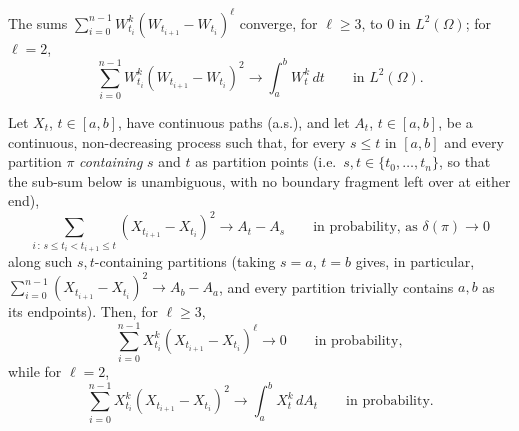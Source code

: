 \documentclass[10pt,a4paper]{amsart}
\begin{document}
\begin{lemma}\label{lem:l1}
The sums $\sum_{i=0}^{n-1}W_{t_i}^k(W_{t_{i+1}}-W_{t_i})^\ell$ converge, for
$\ell\ge3$, to $0$ in $L^2(\Omega)$; for $\ell=2$,
\[
\sum_{i=0}^{n-1}W_{t_i}^k(W_{t_{i+1}}-W_{t_i})^2\longrightarrow\int_a^bW_t^k\,dt
\qquad\text{in }L^2(\Omega).
\]
\end{lemma}

\begin{lemma}\label{lem:l2}
Let $X_t$, $t\in[a,b]$, have continuous paths (a.s.), and let $A_t$,
$t\in[a,b]$, be a continuous, non-decreasing process such that, for
every $s\le t$ in $[a,b]$ and every partition $\pi$ \emph{containing}
$s$ and $t$ as partition points (i.e.\ $s,t\in\{t_0,\ldots,t_n\}$, so
that the sub-sum below is unambiguous, with no boundary fragment left
over at either end),
\[
\sum_{i\,:\,s\le t_i<t_{i+1}\le t}(X_{t_{i+1}}-X_{t_i})^2
\longrightarrow A_t-A_s\qquad\text{in probability, as }\delta(\pi)\to0
\]
along such $s,t$-containing partitions (taking $s=a$, $t=b$ gives, in
particular, $\sum_{i=0}^{n-1}(X_{t_{i+1}}-X_{t_i})^2\to A_b-A_a$, and
every partition trivially contains $a,b$ as its endpoints). Then, for
$\ell\ge3$,
\[
\sum_{i=0}^{n-1}X_{t_i}^k(X_{t_{i+1}}-X_{t_i})^\ell\longrightarrow0
\qquad\text{in probability},
\]
while for $\ell=2$,
\[
\sum_{i=0}^{n-1}X_{t_i}^k(X_{t_{i+1}}-X_{t_i})^2\longrightarrow\int_a^bX_t^k\,dA_t
\qquad\text{in probability}.
\]
\end{lemma}
\end{document}
